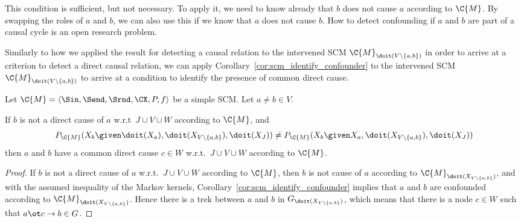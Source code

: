 This condition is sufficient, but not necessary.
To apply it, we need to know already that $b$ does not cause $a$ according to $\C{M}$. By
swapping the roles of $a$ and $b$, we can also use this if we know that $a$ does not cause $b$.
How to detect confounding if $a$ and $b$ are part of a causal cycle is an open research problem.

Similarly to how we applied the result for detecting a causal relation to the intervened
SCM $\C{M}_{\doit(V\setminus \{a,b\})}$ in order to arrive at a criterion to detect a direct causal relation,
we can apply Corollary~\ref{cor:scm_identify_confounder} to the intervened SCM $\C{M}_{\doit(V\setminus \{a,b\})}$
to arrive at a condition to identify the presence of common direct cause.
\begin{Cor}\label{cor:scm_identify_latent_confounder}
Let $\C{M} = \langle \Sin, \Send, \Srnd, \CX, P, f \rangle$ be a simple SCM.
Let $a \ne b \in V$.

If $b$ is not a direct cause of $a$ w.r.t\ $J \cup V \cup W$ according to $\C{M}$, and
  $$P_{\C{M}}(X_b \given \doit(X_a), \doit(X_{V\setminus\{a,b\}}), \doit(X_J)) \ne P_{\C{M}}(X_b \given X_a, \doit(X_{V\setminus\{a,b\}}), \doit(X_J))$$
then $a$ and $b$ have a common direct cause $c \in W$ w.r.t.\ $J \cup V \cup W$ according to $\C{M}$.
\end{Cor}
\begin{proof}
If $b$ is not a direct cause of $a$ w.r.t.\ $J \cup V \cup W$ according to $\C{M}$, then
$b$ is not cause of $a$ according to $\C{M}_{\doit(X_{V\setminus\{a,b\}})}$,
and with the assumed inequality of the Markov kernels,
Corollary~\ref{cor:scm_identify_confounder} implies that
$a$ and $b$ are confounded according to $\C{M}_{\doit(X_{V\setminus\{a,b\}})}$.
Hence there is a trek between $a$ and $b$ in $G_{\doit(X_{V\setminus\{a,b\}})}$,
which means that there is a node $c \in W$ such that $a \ot c \to b \in G$.
\end{proof}

